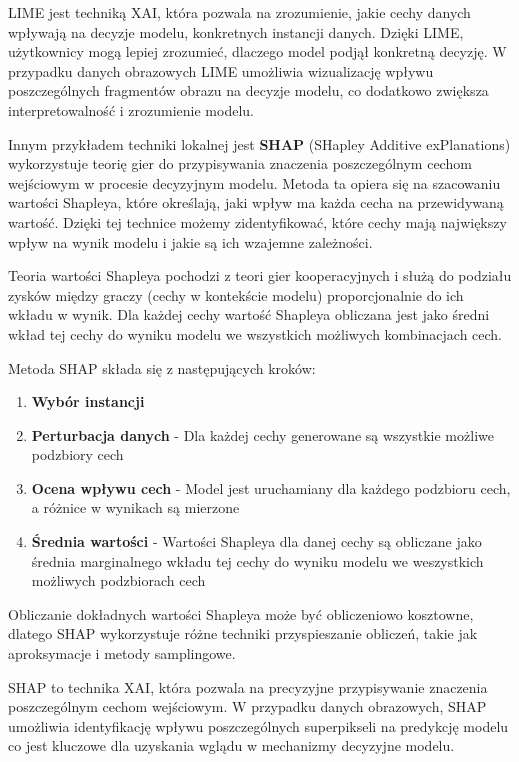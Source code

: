 LIME jest techniką XAI, która pozwala na zrozumienie, jakie cechy danych wpływają na decyzje modelu, konkretnych instancji danych.
Dzięki LIME, użytkownicy mogą lepiej zrozumieć, dlaczego model podjął konkretną decyzję.
W przypadku danych obrazowych LIME umożliwia wizualizację wpływu poszczególnych fragmentów obrazu na decyzje modelu, co dodatkowo zwiększa interpretowalność i zrozumienie modelu.

Innym przykładem techniki lokalnej jest \textbf{SHAP} (SHapley Additive exPlanations)\cite{lundberg2017unified, SHAPmanip} wykorzystuje teorię gier do przypisywania znaczenia poszczególnym cechom wejściowym w procesie decyzyjnym modelu.
Metoda ta opiera się na szacowaniu wartości Shapleya, które określają, jaki wpływ ma każda cecha na przewidywaną wartość.
Dzięki tej technice możemy zidentyfikować, które cechy mają największy wpływ na wynik modelu i jakie są ich wzajemne zależności.

Teoria wartości Shapleya pochodzi z teori gier kooperacyjnych i służą do podziału zysków między graczy (cechy w kontekście modelu) proporcjonalnie do ich wkładu w wynik.
Dla każdej cechy wartość Shapleya obliczana jest jako średni wkład tej cechy do wyniku modelu we wszystkich możliwych kombinacjach cech.

Metoda SHAP składa się z następujących kroków:
\begin{enumerate}
	\item \textbf{Wybór instancji}
	\item \textbf{Perturbacja danych} - Dla każdej cechy generowane są wszystkie możliwe podzbiory cech
	\item \textbf{Ocena wpływu cech} - Model jest uruchamiany dla każdego podzbioru cech, a różnice w wynikach są mierzone
	\item \textbf{Średnia wartości} - Wartości Shapleya dla danej cechy są obliczane jako średnia marginalnego wkładu tej cechy do wyniku modelu we weszystkich możliwych podzbiorach cech
\end{enumerate}

Obliczanie dokładnych wartości Shapleya może być obliczeniowo kosztowne, dlatego SHAP wykorzystuje różne techniki przyspieszanie obliczeń, takie jak aproksymacje i metody samplingowe.

SHAP to technika XAI, która pozwala na precyzyjne przypisywanie znaczenia poszczególnym cechom wejściowym.
W przypadku danych obrazowych, SHAP umożliwia identyfikację wpływu poszczególnych superpikseli na predykcję modelu co jest kluczowe dla uzyskania wglądu w mechanizmy decyzyjne modelu.


